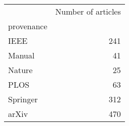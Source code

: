 \begin{tabular}{lr}
\toprule
{} &  Number of articles \\
provenance &                     \\
\midrule
IEEE       &                 241 \\
Manual     &                  41 \\
Nature     &                  25 \\
PLOS       &                  63 \\
Springer   &                 312 \\
arXiv      &                 470 \\
\bottomrule
\end{tabular}
